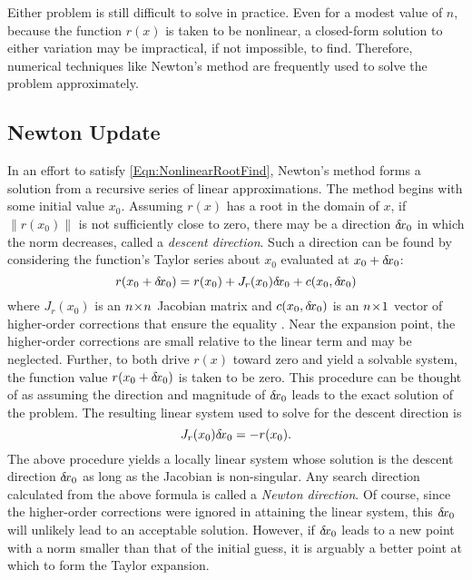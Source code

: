 \documentclass[12pt]{../UWMadThesis}
\begin{document}
Either problem is still difficult to solve in practice.
Even for a modest value of $n$, because the function $r(x)$ is taken to be nonlinear, a closed-form solution to either variation may be impractical, if not impossible, to find.
Therefore, numerical techniques like Newton's method are frequently used to solve the problem approximately.





\subsection{Newton Update}
In an effort to satisfy \cref{Eqn:NonlinearRootFind}, Newton's method forms a solution from a recursive series of linear approximations.
The method begins with some initial value $x_0$.
Assuming $r(x)$ has a root in the domain of $x$, if $\|r(x_0)\|$ is not sufficiently close to zero, there may be a direction $\delta \mkern-3.00mu x_0$ in which the norm decreases, called a \textit{descent direction}.
Such a direction can be found by considering the function's Taylor series about $x_0$ evaluated at $x_0 + \delta \mkern-3.00mu x_0$:
\begin{equation}
    r(x_0 + \delta \mkern-3.00mu x_0) =  r(x_0) + J_r(x_0)\delta \mkern-3.00mu x_0 + c(x_0,\delta \mkern-3.00mu x_0)
\end{equation}
where $J_r(x_0)$ is an $n \!\times\! n$ Jacobian matrix and $c(x_0,\delta \mkern-3.00mu x_0)$ is an $n \!\times\! 1$ vector of higher-order corrections that ensure the equality \cite{eriksson_applied_2003}.
Near the expansion point, the higher-order corrections are small relative to the linear term and may be neglected.
Further, to both drive $r(x)$ toward zero and yield a solvable system, the function value $r(x_0 + \delta \mkern-3.00mu x_0)$ is taken to be zero.
This procedure can be thought of as assuming the direction and magnitude of $\delta \mkern-3.00mu x_0$ leads to the exact solution of the problem.
The resulting linear system used to solve for the descent direction is
\begin{equation}
    J_{r}(x_0) \delta \mkern-3.00mu x_0 = -r(x_0).
    \label{Eqn:NewtonsDirection}
\end{equation}
The above procedure yields a locally linear system whose solution is the descent direction $\delta \mkern-3.00mu x_0$ as long as the Jacobian is non-singular.
Any search direction calculated from the above formula is called a \textit{Newton direction}.
Of course, since the higher-order corrections were ignored in attaining the linear system, this $\delta \mkern-3.00mu x_0$ will unlikely lead to an acceptable solution.
However, if $\delta \mkern-3.00mu x_0$ leads to a new point with a norm smaller than that of the initial guess, it is arguably a better point at which to form the Taylor expansion.
\end{document}
